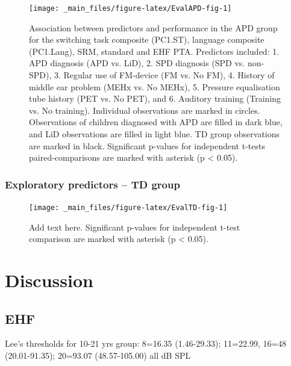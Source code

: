 \documentclass[a4paper, twoside]{templates/ociamthesis}
\begin{document}
\begin{figure}

{\centering \texttt{[image: \_main\_files/figure-latex/EvalAPD-fig-1]} 

}

\caption{Association between predictors and performance in the APD group for the switching task composite (PC1.ST), language composite (PC1.Lang), SRM, standard and EHF PTA. Predictors included: 1. APD diagnosis (APD vs. LiD), 2. SPD diagnosis (SPD vs. non-SPD), 3. Regular use of FM-device (FM vs. No FM), 4. History of middle ear problem (MEHx vs. No MEHx), 5. Pressure equalisation tube history (PET vs. No PET), and 6. Auditory training (Training vs. No training). Individual observations are marked in circles. Observations of children diagnosed with APD are filled in dark blue, and LiD observations are filled in light blue. TD group observations are marked in black. Significant p-values for independent t-tests paired-comparisons are marked with asterisk (p < 0.05).}\label{fig:EvalAPD-fig}
\end{figure}

\hypertarget{exploratory-predictors-td-group}{%
\subsubsection{Exploratory predictors -- TD group}\label{exploratory-predictors-td-group}}

\begin{figure}

{\centering \texttt{[image: \_main\_files/figure-latex/EvalTD-fig-1]} 

}

\caption{Add text here. Significant p-values for independent t-test comparison are marked with asterisk (p < 0.05).}\label{fig:EvalTD-fig}
\end{figure}

\hypertarget{discussion-4}{%
\section{Discussion}\label{discussion-4}}

\hypertarget{ehf}{%
\subsection{EHF}\label{ehf}}

Lee's thresholds for 10-21 yrs group: 8=16.35 (1.46-29.33); 11=22.99, 16=48 (20.01-91.35); 20=93.07 (48.57-105.00) all dB SPL
\end{document}
